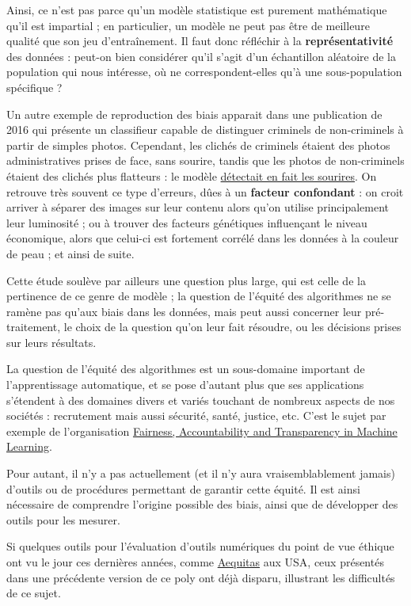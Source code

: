 Ainsi, ce n'est pas parce qu'un modèle statistique est purement mathématique
qu'il est impartial ; en particulier, un modèle ne peut pas être de meilleure
qualité que son jeu d'entraînement. Il faut donc réfléchir à la
\textbf{représentativité} des données : peut-on bien considérer qu'il s'agit
d'un échantillon aléatoire de la population qui nous intéresse, où ne
correspondent-elles qu'à une sous-population spéci\-fique ?

Un autre exemple de reproduction des biais apparait dans une publication de
2016 qui présente un classifieur capable de distinguer criminels de
non-criminels à partir de simples photos. Cependant, les clichés de criminels
étaient des photos administratives prises de face, sans sourire, tandis que les
photos de non-criminels étaient des clichés plus flatteurs : le modèle
 \href{https://callingbullshit.org/case\_studies/case\_study\_criminal\_machine\_learning.html}{détectait
  en fait les sourires}. On retrouve très souvent ce type d'erreurs, dûes à un
\textbf{facteur confondant} : on croit arriver à séparer des images sur leur
contenu alors qu'on utilise principalement leur luminosité ; ou à trouver des
facteurs génétiques influençant le niveau économique, alors que celui-ci est
fortement corrélé dans les données à la couleur de peau ; et ainsi de suite.

Cette étude soulève par ailleurs une question plus large, qui est celle de la
pertinence de ce genre de modèle ; la question de l'équité des algorithmes ne
se ramène pas qu'aux biais dans les données, mais peut aussi concerner leur
pré-traitement, le choix de la question qu'on leur fait résoudre, ou les
décisions prises sur leurs résultats.

La question de l'équité des algorithmes est un sous-domaine important de
l'apprentissage au\-to\-ma\-ti\-que, et se pose d'autant plus que ses applications
s'étendent à des domaines divers et variés touchant de nombreux aspects de nos
sociétés : recrutement mais aussi sécurité, santé, justice, etc. 
C'est le sujet par exemple de l'organisation
\href{https://facctconference.org}{Fairness, Accountability and Transparency in
  Machine Learning}.

Pour autant, il n'y a pas actuellement (et il n'y aura vraisemblablement
jamais) d'outils ou de pro\-cé\-du\-res permettant de garantir cette équité. Il est
ainsi nécessaire de comprendre l'origine possible des biais, ainsi que de
développer des outils pour les mesurer.

Si quelques outils pour l'évaluation d'outils numériques du point de vue
éthique ont vu le jour ces dernières années, comme
\href{http://aequitas.dssg.io/}{Aequitas} aux USA, ceux présentés dans une précédente version de ce poly ont déjà disparu, illustrant les difficultés de ce sujet.

